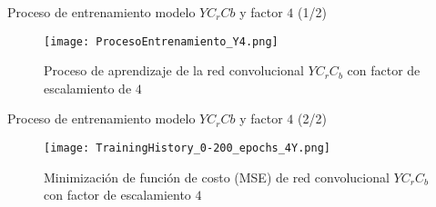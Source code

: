 \begin{frame}{Proceso de entrenamiento modelo $YC_rCb$ y factor $4$ (1/2)}
    \begin{figure}[H]
        \centering
        \texttt{[image: ProcesoEntrenamiento\_Y4.png]}
        \caption{Proceso de aprendizaje de la red convolucional $YC_rC_b$ con factor de escalamiento de $4$}
        \label{fig:SRCNN_MSE_TrainingProcess4Y}
    \end{figure}
\end{frame}
\begin{frame}{Proceso de entrenamiento modelo $YC_rCb$ y factor $4$ (2/2)}
    \begin{figure}[H]
        \centering
        \texttt{[image: TrainingHistory\_0-200\_epochs\_4Y.png]}
        \caption{Minimización de función de costo (MSE) de red convolucional $YC_rC_b$ con factor de escalamiento $4$}
        \label{fig:SRCNN_MSE_TrainingLoss4Y}
    \end{figure}
\end{frame}